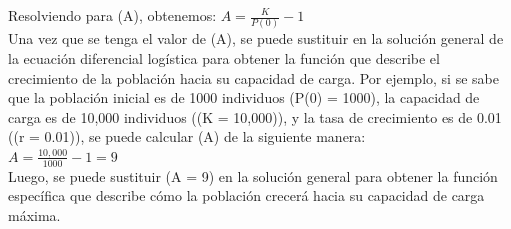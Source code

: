 \documentclass[a4paper,10pt,twocolumn]{article}
\begin{document}
Resolviendo para (A), obtenemos: $A = \frac{K}{P(0)} - 1$\\
Una vez que se tenga el valor de (A), se puede sustituir en la solución general de la ecuación diferencial 
logística para obtener la función que describe el crecimiento de la población hacia su capacidad de carga.
Por ejemplo, si se sabe que la población inicial es de 1000 individuos (P(0) = 1000), la capacidad de carga 
es de 10,000 individuos ((K = 10,000)), y la tasa de crecimiento es de 0.01 ((r = 0.01)), 
se puede calcular (A) de la siguiente manera:\\
$A = \frac{10,000}{1000} - 1 = 9$\\
Luego, se puede sustituir (A = 9) en la solución general para obtener la función específica que describe cómo la 
población crecerá hacia su capacidad de carga máxima.\\\\

\end{document}
